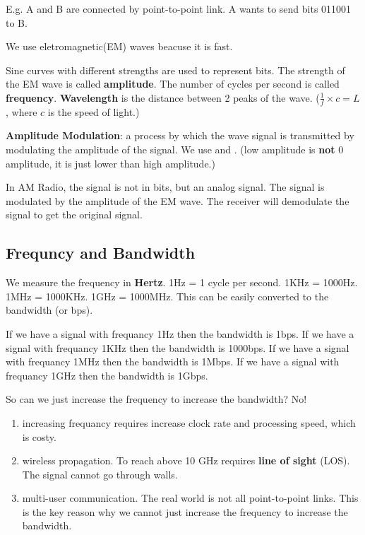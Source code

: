 \documentclass{../../ainote}
\begin{document}
E.g. A and B are connected by point-to-point link. A wants to send bits 011001 to B.

We use eletromagnetic(EM) waves beacuse it is fast.

Sine curves with different strengths are used to represent bits. The strength of the EM wave is called \textbf{amplitude}. The number of cycles per second is called \textbf{frequency}. \textbf{Wavelength} is the distance between 2 peaks of the wave. ($\frac{1}{f} \times c = L$, where $c$ is the speed of light.)

\textbf{Amplitude Modulation}: a process by which the wave signal is transmitted by modulating the amplitude of the signal. We use  and . (low amplitude is \textbf{not} 0 amplitude, it is just lower than high amplitude.) 


\begin{supp}
    In AM Radio, the signal is not in bits, but an analog signal. The signal is modulated by the amplitude of the EM wave. The receiver will demodulate the signal to get the original signal.
\end{supp}

\subsection{Frequncy and Bandwidth}
We measure the frequency in \textbf{Hertz}. 1Hz = 1 cycle per second. 1KHz = 1000Hz. 1MHz = 1000KHz. 1GHz = 1000MHz. This can be easily converted to the bandwidth (or bps).

If we have a signal with frequancy 1Hz then the bandwidth is 1bps. If we have a signal with frequancy 1KHz then the bandwidth is 1000bps. If we have a signal with frequancy 1MHz then the bandwidth is 1Mbps. If we have a signal with frequancy 1GHz then the bandwidth is 1Gbps.

So can we just increase the frequency to increase the bandwidth? No!
\begin{enumerate}
    \item increasing frequancy requires increase clock rate and processing speed, which is costy.
    \item wireless propagation. To reach above 10 GHz requires \textbf{line of sight} (LOS). The signal cannot go through walls.
    \item multi-user communication. The real world is not all point-to-point links. This is the key reason why we cannot just increase the frequency to increase the bandwidth.
\end{enumerate}
\end{document}
